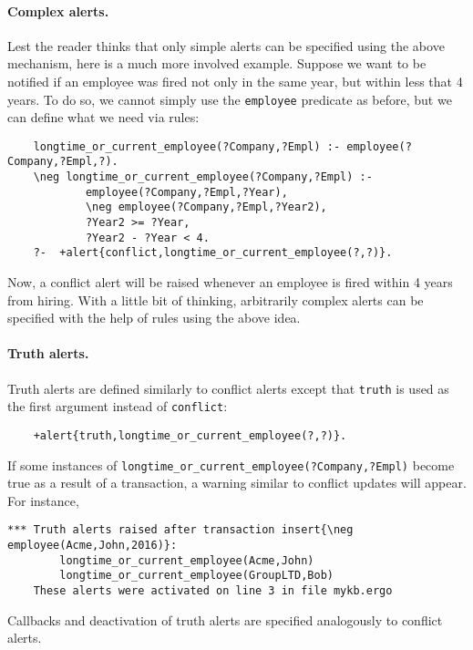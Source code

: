 \paragraph{Complex alerts.} Lest the reader thinks that only simple
alerts can be specified using the above mechanism, here is a much more
involved example. Suppose we want to be notified if an employee 
was fired not only in the same year, but within less that 4 years. To do so, we
cannot simply use the \texttt{employee} 
predicate as before, but we can define what
we need via rules:
\begin{verbatim}
    longtime_or_current_employee(?Company,?Empl) :- employee(?Company,?Empl,?).
    \neg longtime_or_current_employee(?Company,?Empl) :-
            employee(?Company,?Empl,?Year),
            \neg employee(?Company,?Empl,?Year2),
            ?Year2 >= ?Year,
            ?Year2 - ?Year < 4.
    ?-  +alert{conflict,longtime_or_current_employee(?,?)}.
\end{verbatim}
Now, a conflict alert will be raised whenever an employee is fired within
4 years from hiring.  With a little bit of thinking, arbitrarily complex
alerts can be specified with the help of rules using the above idea.

\paragraph{Truth alerts.}
Truth alerts are defined similarly to conflict alerts except that
\texttt{truth} is used as the first argument instead of \texttt{conflict}:
\begin{verbatim}
    +alert{truth,longtime_or_current_employee(?,?)}.
\end{verbatim}
If some instances of \texttt{longtime\_or\_current\_employee(?Company,?Empl)} 
become true as a result of a transaction, a warning similar to conflict
updates will appear. For instance,
\begin{verbatim}
*** Truth alerts raised after transaction insert{\neg employee(Acme,John,2016)}:
        longtime_or_current_employee(Acme,John)
        longtime_or_current_employee(GroupLTD,Bob)
    These alerts were activated on line 3 in file mykb.ergo
\end{verbatim}
Callbacks and deactivation of truth alerts are specified
analogously to conflict alerts.

